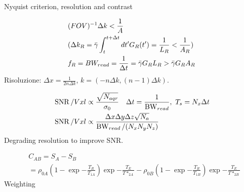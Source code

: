 \begin{frame}[allowframebreaks]{Nyquist criterion, resolution and contrast}

\begin{align*}
&(FOV)^{-1}\Delta k<\frac{1}{A}\\
&(\Delta k_R=\gammabar\int_t^{t+\Delta t}d t'G_R(t')=\frac{1}{L_R}<\frac{1}{A_R})\\
&f_R=BW_{read}=\frac{1}{\Delta t}=\gammabar G_RL_R>\gammabar G_RA_R
\end{align*}
Risoluzione: $\Delta x=\frac{1}{2n\Delta k}$, $k=(-n\Delta k,(n-1)\Delta k)$.

\begin{align*}
&\operatorname{SNR}/Vxl\propto\frac{\sqrt{N_{aqr}}}{\sigma_0}\quad \Delta t= \frac{1}{\operatorname{BW}_{read}},\ T_s=N_x\Delta t\\
&\operatorname{SNR}/Vxl\propto \frac{\Delta x\Delta y\Delta z\sqrt{N_a}}{\operatorname{BW}_{read}/(N_xN_yN_z)}
\end{align*}
Degrading resolution to improve SNR.

\begin{align*}
&C_{AB}=S_A-S_B\\
&=\rho_{0A}(1-\exp{-\frac{T_R}{T_{1A}}})\exp{-\frac{T_E}{T*_{2A}}}-\rho_{0B}(1-\exp{-\frac{T_R}{T_{1B}}})\exp{-\frac{T_E}{T*_{2B}}}
\end{align*}
Weighting
\end{frame}